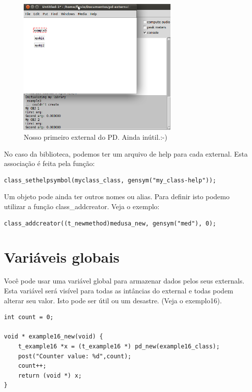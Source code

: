 \documentclass[10pt,a4paper]{report}
\begin{document}
\begin{figure}[h!]
	\centering
	\includegraphics[width=0.7\textwidth]{example3}
	\caption{Nosso primeiro external do PD. Ainda inútil.:-)}
\end{figure}


No caso da biblioteca, podemos ter um arquivo de help para cada external. Esta associação é feita pela função:
\begin{lstlisting}
class_sethelpsymbol(myclass_class, gensym("my_class-help"));
\end{lstlisting}

Um objeto pode ainda ter outros nomes ou alias. Para definir isto podemo utilizar a função class\_addcreator. Veja o exemplo:

\begin{lstlisting}
class_addcreator((t_newmethod)medusa_new, gensym("med"), 0);
\end{lstlisting}

\section{Variáveis globais}
Você pode usar uma variável global para armazenar dados pelos seus externals. Esta variável será visível para todas as intâncias do external e todas podem alterar seu valor. Isto pode ser útil ou um desastre. (Veja o exemplo16).

\begin{lstlisting}
int count = 0;

void * example16_new(void) {
    t_example16 *x = (t_example16 *) pd_new(example16_class);
    post("Counter value: %d",count);
    count++;
    return (void *) x;
}
\end{lstlisting}
\end{document}
